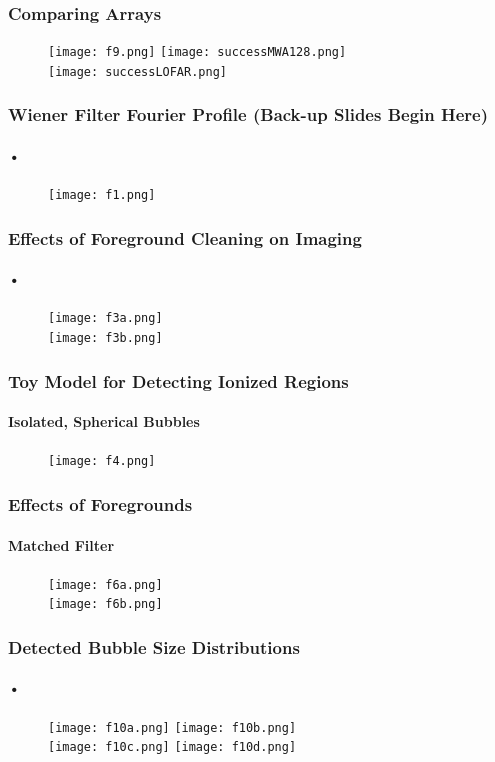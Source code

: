 \documentclass{beamer}
\begin{document}
\begin{frame}
\frametitle{Comparing Arrays}
\begin{figure}[h]
  \centering
  \texttt{[image: f9.png]}
  \texttt{[image: successMWA128.png]}\\
  \texttt{[image: successLOFAR.png]}
\end{figure}
\end{frame}

\begin{frame}
\frametitle{Wiener Filter Fourier Profile (Back-up Slides Begin Here)}
\framesubtitle{•}
\begin{figure}[h]
  \centering
  \texttt{[image: f1.png]}
\end{figure}
\end{frame}

\begin{frame}
\frametitle{Effects of Foreground Cleaning on Imaging}
\framesubtitle{•}
\begin{figure}[h]
  \centering
  \texttt{[image: f3a.png]}\\
  \texttt{[image: f3b.png]}
\end{figure}
\end{frame}

\begin{frame}
\frametitle{Toy Model for Detecting Ionized Regions}
\framesubtitle{Isolated, Spherical Bubbles}
\begin{figure}[h]
  \centering
  \texttt{[image: f4.png]}
\end{figure}
\end{frame}

\begin{frame}
\frametitle{Effects of Foregrounds}
\framesubtitle{Matched Filter}
\begin{figure}[h]
  \centering
  \texttt{[image: f6a.png]}\\
  \texttt{[image: f6b.png]}
\end{figure}
\end{frame}

\begin{frame}
\frametitle{Detected Bubble Size Distributions}
\framesubtitle{•}
\begin{figure}[h]
  \centering
  \texttt{[image: f10a.png]}
  \texttt{[image: f10b.png]}\\
  \texttt{[image: f10c.png]}
  \texttt{[image: f10d.png]}
\end{figure}
\end{frame}
\end{document}
